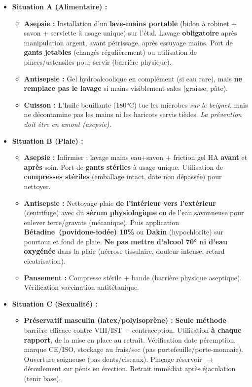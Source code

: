 \documentclass[11pt]{article}
\begin{document}
\begin{exoresolu}
\begin{itemize}
    \item \textbf{Situation A (Alimentaire) :}
    \begin{itemize}
        \item \textbf{Asepsie :} Installation d'un \textbf{lave-mains portable} (bidon à robinet + savon + serviette à usage unique) sur l'étal. Lavage \textbf{obligatoire} après manipulation argent, avant pétrissage, après essuyage mains. Port de \textbf{gants jetables} (changés régulièrement) ou utilisation de pinces/ustensiles pour servir (barrière physique).
        \item \textbf{Antisepsie :} Gel hydroalcoolique en complément (si eau rare), mais \textbf{ne remplace pas le lavage} si mains visiblement sales (graisse, pâte).
        \item \textbf{Cuisson :} L'huile bouillante (180°C) tue les microbes \emph{sur le beignet}, mais ne décontamine pas les mains ni les haricots servis tièdes. \emph{La prévention doit être en amont (asepsie).}
    \end{itemize}
    \item \textbf{Situation B (Plaie) :}
    \begin{itemize}
        \item \textbf{Asepsie :} Infirmier : lavage mains eau+savon + friction gel HA \textbf{avant} et \textbf{après} soin. Port de \textbf{gants stériles} à usage unique. Utilisation de \textbf{compresses stériles} (emballage intact, date non dépassée) pour nettoyer.
        \item \textbf{Antisepsie :} Nettoyage plaie \textbf{de l'intérieur vers l'extérieur} (centrifuge) avec du \textbf{sérum physiologique} ou de l'eau savonneuse pour enlever terre/gravats (mécanique). Puis application \textbf{Bétadine\textregistered\ (povidone-iodée) 10\%} ou \textbf{Dakin\textregistered} (hypochlorite) sur pourtour et fond de plaie. \textbf{Ne pas mettre d'alcool 70° ni d'eau oxygénée} dans la plaie (nécrose tissulaire, douleur intense, retard cicatrisation).
        \item \textbf{Pansement :} Compresse stérile + bande (barrière physique aseptique). Vérification vaccination antitétanique.
    \end{itemize}
    \item \textbf{Situation C (Sexualité) :}
    \begin{itemize}
        \item \textbf{Préservatif masculin (latex/polyisoprène) :} \textbf{Seule méthode} barrière efficace contre VIH/IST + contraception. Utilisation \textbf{à chaque rapport}, de la mise en place au retrait. Vérification date péremption, marque CE/ISO, stockage au frais/sec (pas portefeuille/porte-monnaie). Ouverture soigneuse (pas dents/ciseaux). Pinçage réservoir $\to$ déroulement sur pénis en érection. Retrait immédiat après éjaculation (tenir base).

\end{itemize}
\end{itemize}
\end{exoresolu}
\end{document}
